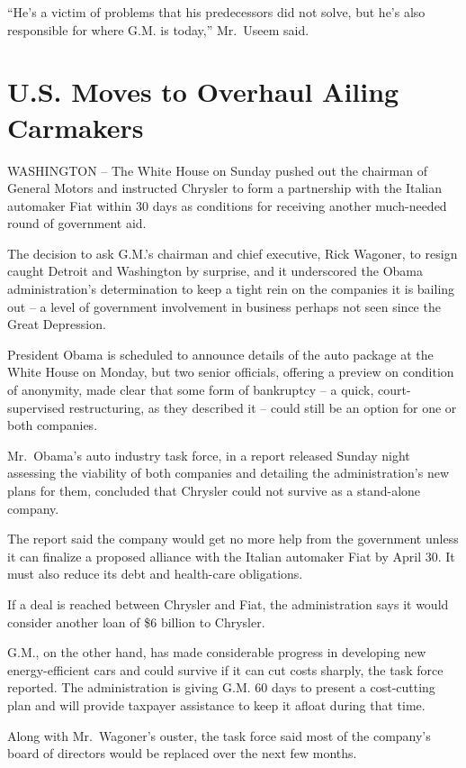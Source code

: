 \documentclass[12pt,a4paper,onecolumn]{article}
\begin{document}
``He's a victim of problems that his predecessors did not solve, but he's also responsible for where
G.M. is today,'' Mr.~Useem said.


\section{U.S. Moves to Overhaul Ailing Carmakers}

WASHINGTON -- The White House on Sunday pushed out the chairman of General Motors and instructed
Chrysler to form a partnership with the Italian automaker Fiat within 30 days as conditions for
receiving another much-needed round of government aid.

The decision to ask G.M.'s chairman and chief executive, Rick Wagoner, to resign caught Detroit and
Washington by surprise, and it underscored the Obama administration's determination to keep a tight
rein on the companies it is bailing out -- a level of government involvement in business perhaps not
seen since the Great Depression.

President Obama is scheduled to announce details of the auto package at the White House on Monday,
but two senior officials, offering a preview on condition of anonymity, made clear that some form of
bankruptcy -- a quick, court-supervised restructuring, as they described it -- could still be an
option for one or both companies.

Mr.~Obama's auto industry task force, in a report released Sunday night assessing the viability of
both companies and detailing the administration's new plans for them, concluded that Chrysler could
not survive as a stand-alone company.

The report said the company would get no more help from the government unless it can finalize a
proposed alliance with the Italian automaker Fiat by April 30. It must also reduce its debt and
health-care obligations.

If a deal is reached between Chrysler and Fiat, the administration says it would consider another
loan of \$6 billion to Chrysler.

G.M., on the other hand, has made considerable progress in developing new energy-efficient cars and
could survive if it can cut costs sharply, the task force reported. The administration is giving
G.M. 60 days to present a cost-cutting plan and will provide taxpayer assistance to keep it afloat
during that time.

Along with Mr.~Wagoner's ouster, the task force said most of the company's board of directors would
be replaced over the next few months.
\end{document}
